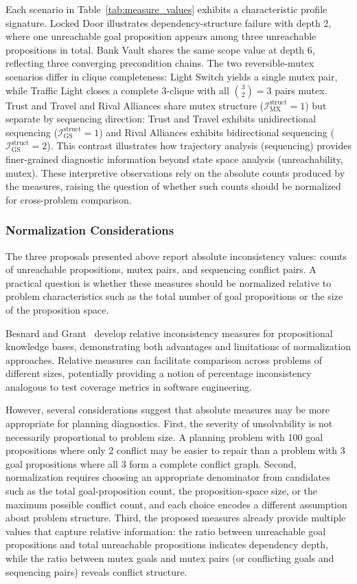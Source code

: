 Each scenario in Table~\ref{tab:measure_values} exhibits a characteristic profile signature. Locked Door illustrates dependency-structure failure with depth 2, where one unreachable goal proposition appears among three unreachable propositions in total. Bank Vault shares the same scope value at depth 6, reflecting three converging precondition chains. The two reversible-mutex scenarios differ in clique completeness: Light Switch yields a single mutex pair, while Traffic Light closes a complete 3-clique with all $\binom{3}{2} = 3$ pairs mutex. Trust and Travel and Rival Alliances share mutex structure ($\mathcal{I}^{\text{struct}}_{\text{MX}} = 1$) but separate by sequencing direction: Trust and Travel exhibits unidirectional sequencing ($\mathcal{I}^{\text{struct}}_{\text{GS}} = 1$) and Rival Alliances exhibits bidirectional sequencing ($\mathcal{I}^{\text{struct}}_{\text{GS}} = 2$). This contrast illustrates how trajectory analysis (sequencing) provides finer-grained diagnostic information beyond state space analysis (unreachability, mutex). These interpretive observations rely on the absolute counts produced by the measures, raising the question of whether such counts should be normalized for cross-problem comparison.

\subsubsection{Normalization Considerations}

The three proposals presented above report absolute inconsistency values: counts of unreachable propositions, mutex pairs, and sequencing conflict pairs. A practical question is whether these measures should be normalized relative to problem characteristics such as the total number of goal propositions or the size of the proposition space.

Besnard and Grant~\cite{Besnard2020} develop relative inconsistency measures for propositional knowledge bases, demonstrating both advantages and limitations of normalization approaches. Relative measures can facilitate comparison across problems of different sizes, potentially providing a notion of percentage inconsistency analogous to test coverage metrics in software engineering.

However, several considerations suggest that absolute measures may be more appropriate for planning diagnostics. First, the severity of unsolvability is not necessarily proportional to problem size. A planning problem with 100 goal propositions where only 2 conflict may be easier to repair than a problem with 3 goal propositions where all 3 form a complete conflict graph. Second, normalization requires choosing an appropriate denominator from candidates such as the total goal-proposition count, the proposition-space size, or the maximum possible conflict count, and each choice encodes a different assumption about problem structure. Third, the proposed measures already provide multiple values that capture relative information: the ratio between unreachable goal propositions and total unreachable propositions indicates dependency depth, while the ratio between mutex goals and mutex pairs (or conflicting goals and sequencing pairs) reveals conflict structure.

